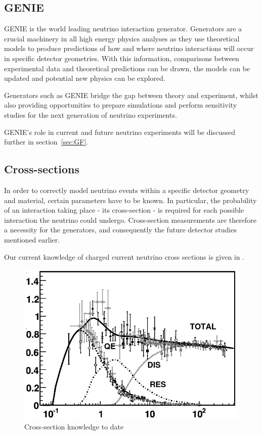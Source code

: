 \subsection{GENIE}

    GENIE is the world leading neutrino interaction generator. Generators are a crucial machinery in all high energy physics analyses as they use theoretical models to produce predictions of how and where neutrino interactions will occur in specific detector geometries. With this information, comparisons between experimental data and theoretical predictions can be drawn, the models can be updated and potential new physics can be explored.

    Generators such as GENIE bridge the gap between theory and experiment, whilst also providing opportunities to prepare simulations and perform sensitivity studies for the next generation of neutrino experiments.

    GENIE's role in current and future neutrino experiments will be discussed further in section~\ref{sec:GF}.

\subsection{Cross-sections}
   
    In order to correctly model neutrino events within a specific detector geometry and material, certain parameters have to be known. In particular, the probability of an interaction taking place - its cross-section - is required for each possible interaction the neutrino could undergo. Cross-section measurements are therefore a necessity for the generators, and consequently the future detector studies mentioned earlier. 
    
    Our current knowledge of charged current neutrino cross sections is given in \cite{xsecCurr}. 

    \begin{figure}[h!]
        \center
        \includegraphics[width=.8\textwidth]{images/current_cross_sec_knowledge.pdf}
        \caption{ Cross-section knowledge to date}
        \label{fig:xsecCurr}
    \end{figure}

